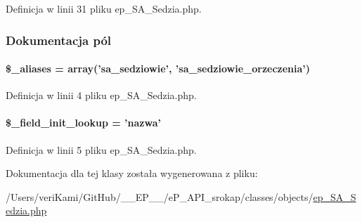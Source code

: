 Definicja w linii 31 pliku ep\-\_\-\-S\-A\-\_\-\-Sedzia.\-php.



\subsubsection{Dokumentacja pól}
\hypertarget{classep___s_a___sedzia_ab4e31d75f0bc5d512456911e5d01366b}{
\paragraph[{\$\-\_\-aliases}]{\setlength{\rightskip}{0pt plus 5cm}\$\-\_\-aliases = array('sa\-\_\-sedziowie', 'sa\-\_\-sedziowie\-\_\-orzeczenia')}}\label{classep___s_a___sedzia_ab4e31d75f0bc5d512456911e5d01366b}


Definicja w linii 4 pliku ep\-\_\-\-S\-A\-\_\-\-Sedzia.\-php.

\hypertarget{classep___s_a___sedzia_a4a4d54ae35428077a7c61ec8a5139af3}{
\paragraph[{\$\-\_\-field\-\_\-init\-\_\-lookup}]{\setlength{\rightskip}{0pt plus 5cm}\$\-\_\-field\-\_\-init\-\_\-lookup = 'nazwa'}}\label{classep___s_a___sedzia_a4a4d54ae35428077a7c61ec8a5139af3}


Definicja w linii 5 pliku ep\-\_\-\-S\-A\-\_\-\-Sedzia.\-php.



Dokumentacja dla tej klasy została wygenerowana z pliku\-:\begin{DoxyCompactItemize}
\item 
/\-Users/veri\-Kami/\-Git\-Hub/\-\_\-\-\_\-\-E\-P\-\_\-\-\_\-/e\-P\-\_\-\-A\-P\-I\-\_\-srokap/classes/objects/\hyperlink{ep___s_a___sedzia_8php}{ep\-\_\-\-S\-A\-\_\-\-Sedzia.\-php}\end{DoxyCompactItemize}
